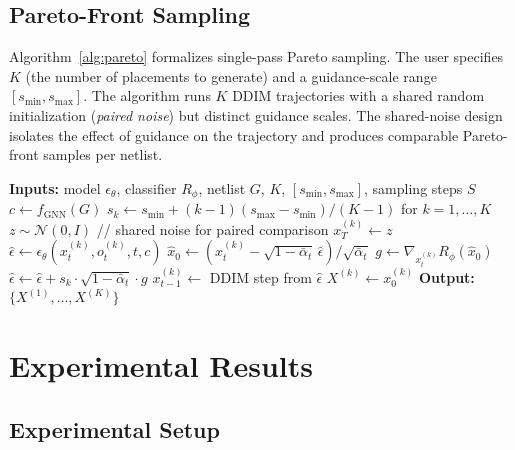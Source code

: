 \documentclass{ieeeaccess}
\begin{document}
\subsection{Pareto-Front Sampling}

Algorithm~\ref{alg:pareto} formalizes single-pass Pareto sampling. The user specifies $K$ (the number of placements to generate) and a guidance-scale range $[s_\textrm{min}, s_\textrm{max}]$. The algorithm runs $K$ DDIM trajectories with a shared random initialization (\emph{paired noise}) but distinct guidance scales. The shared-noise design isolates the effect of guidance on the trajectory and produces comparable Pareto-front samples per netlist.

\begin{algorithm}[t]
\caption{PareDiff Pareto-Front Sampling}
\label{alg:pareto}
\begin{algorithmic}[1]
\STATE \textbf{Inputs:} model $\epsilon_\theta$, classifier $R_\phi$, netlist $G$, $K$, $[s_\textrm{min}, s_\textrm{max}]$, sampling steps $S$
\STATE $c \leftarrow f_\textrm{GNN}(G)$
\STATE $s_k \leftarrow s_\textrm{min} + (k-1)(s_\textrm{max} - s_\textrm{min})/(K-1)$ for $k = 1, \dots, K$
\STATE $z \sim \mathcal{N}(0, I)$ \quad // shared noise for paired comparison
    \STATE $x_T^{(k)} \leftarrow z$
        \STATE $\hat\epsilon \leftarrow \epsilon_\theta(x_t^{(k)}, o_t^{(k)}, t, c)$
        \STATE $\hat{x}_0 \leftarrow (x_t^{(k)} - \sqrt{1 - \bar{\alpha}_t}\,\hat\epsilon) / \sqrt{\bar{\alpha}_t}$
        \STATE $g \leftarrow \nabla_{x_t^{(k)}} R_\phi(\hat{x}_0)$
        \STATE $\hat\epsilon \leftarrow \hat\epsilon + s_k \cdot \sqrt{1 - \bar{\alpha}_t} \cdot g$
        \STATE $x_{t-1}^{(k)} \leftarrow$ DDIM step from $\hat\epsilon$
    \ENDFOR
    \STATE $X^{(k)} \leftarrow x_0^{(k)}$
\ENDFOR
\STATE \textbf{Output:} $\{X^{(1)}, \dots, X^{(K)}\}$
\end{algorithmic}
\end{algorithm}

\section{Experimental Results}
\label{sec:experiments}

\subsection{Experimental Setup}
\end{document}
